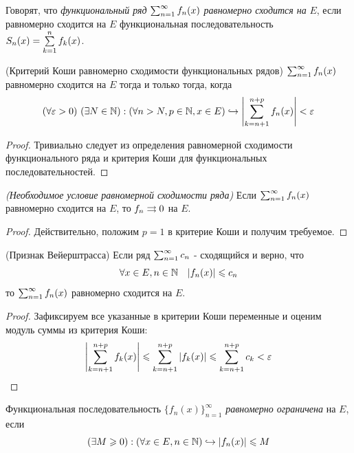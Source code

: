 \begin{definition}
	Говорят, что \textit{функциональный ряд} $\sum_{n = 1}^\infty f_n(x)$ \textit{равномерно сходится на} $E$, если равномерно сходится на $E$ функциональная последовательность $S_n(x) = \sum\limits_{k = 1}^n f_k(x)$.
\end{definition}

\begin{theorem} (Критерий Коши равномерно сходимости функциональных рядов)
	$\sum_{n = 1}^\infty f_n(x)$ равномерно сходится на $E$ тогда и только тогда, когда
	\[
		(\forall \varepsilon > 0)\ (\exists N \in \mathbb{N}) : (\forall n > N, p \in \mathbb{N}, x \in E) \hookrightarrow \left|\sum\limits_{k = n + 1}^{n + p} f_n(x)\right| < \varepsilon
	\]
\end{theorem}

\begin{proof}
	Тривиально следует из определения равномерной сходимости функционального ряда и критерия Коши для функциональных последовательностей.
\end{proof}

\begin{corollary} \textit{(Необходимое условие равномерной сходимости ряда)}
	Если $\sum_{n = 1}^\infty f_n(x)$ равномерно сходится на $E$, то $f_n \rightrightarrows 0$ на $E$.
\end{corollary}

\begin{proof}
	Действительно, положим $p = 1$ в критерие Коши и получим требуемое.
\end{proof}

\begin{theorem} (Признак Вейерштрасса)
	Если ряд $\sum_{n = 1}^\infty c_n$ - сходящийся и верно, что
	\[
		\forall x \in E, n \in \mathbb{N} \quad |f_n(x)| \leqslant c_n
	\]
	 то $\sum_{n = 1}^\infty f_n(x)$ равномерно сходится на $E$.
\end{theorem}

\begin{proof}
	Зафиксируем все указанные в критерии Коши переменные и оценим модуль суммы из критерия Коши:
	\[
		\left|\sum\limits_{k = n + 1}^{n + p} f_k(x)\right| \leqslant \sum\limits_{k = n + 1}^{n + p} |f_k(x)| \leqslant \sum\limits_{k = n + 1}^{n + p} c_k < \varepsilon
	\]
\end{proof}

\begin{definition}
	Функциональная последовательность $\{f_n(x)\}_{n = 1}^\infty$ \textit{равномерно ограничена} на $E$, если
	\[
		(\exists M \geqslant 0) : (\forall x \in E, n \in \mathbb{N}) \hookrightarrow |f_n(x)| \leqslant M
	\]
\end{definition}

